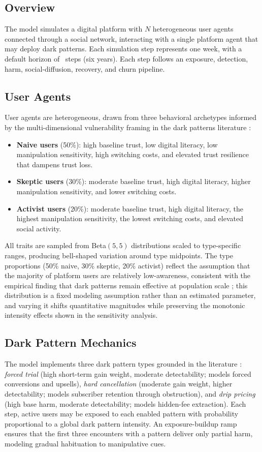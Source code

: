\documentclass[a4paper,fleqn]{cas-sc}
\begin{document}
\subsection{Overview}
The model simulates a digital platform with $N$ heterogeneous user agents connected through a social network, interacting with a single platform agent that may deploy dark patterns. Each simulation step represents one week, with a default horizon of \maxSteps\ steps (six years). Each step follows an exposure, detection, harm, social-diffusion, recovery, and churn pipeline.

\subsection{User Agents}
User agents are heterogeneous, drawn from three behavioral archetypes informed by the multi-dimensional vulnerability framing in the dark patterns literature \citep{rossi2024}:
\begin{itemize}
\item \textbf{Naive users} (50\%): high baseline trust, low digital literacy, low manipulation sensitivity, high switching costs, and elevated trust resilience that dampens trust loss.
\item \textbf{Skeptic users} (30\%): moderate baseline trust, high digital literacy, higher manipulation sensitivity, and lower switching costs.
\item \textbf{Activist users} (20\%): moderate baseline trust, high digital literacy, the highest manipulation sensitivity, the lowest switching costs, and elevated social activity.
\end{itemize}
All traits are sampled from Beta$(5,5)$ distributions scaled to type-specific ranges, producing bell-shaped variation around type midpoints. The type proportions (50\% naive, 30\% skeptic, 20\% activist) reflect the assumption that the majority of platform users are relatively low-awareness, consistent with the empirical finding that dark patterns remain effective at population scale \citep{luguri2021}; this distribution is a fixed modeling assumption rather than an estimated parameter, and varying it shifts quantitative magnitudes while preserving the monotonic intensity effects shown in the sensitivity analysis.

\subsection{Dark Pattern Mechanics}
The model implements three dark pattern types grounded in the literature \citep{mathur2019,luguri2021}: \emph{forced trial} (high short-term gain weight, moderate detectability; models forced conversions and upsells), \emph{hard cancellation} (moderate gain weight, higher detectability; models subscriber retention through obstruction), and \emph{drip pricing} (high base harm, moderate detectability; models hidden-fee extraction). Each step, active users may be exposed to each enabled pattern with probability proportional to a global dark pattern intensity. An exposure-buildup ramp ensures that the first three encounters with a pattern deliver only partial harm, modeling gradual habituation to manipulative cues.
\end{document}
